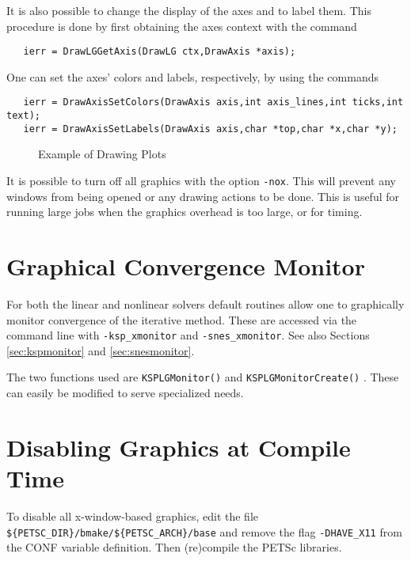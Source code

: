 {It is also possible to change the display of the axes and to label
them. This procedure is done by first obtaining the axes context with the 
command  
\begin{verbatim}
   ierr = DrawLGGetAxis(DrawLG ctx,DrawAxis *axis);
\end{verbatim}
One can set the axes' colors and labels, respectively, by using the
commands  
\begin{verbatim}
   ierr = DrawAxisSetColors(DrawAxis axis,int axis_lines,int ticks,int text);
   ierr = DrawAxisSetLabels(DrawAxis axis,char *top,char *x,char *y);
\end{verbatim}

\begin{figure}[H]
{\small
{}
}
\caption{Example of Drawing Plots}
\label{fig:plot}
\end{figure}

It is possible to turn off all graphics with the option 
{\tt -nox}. This
will prevent any windows from being opened or any drawing actions to be done.
This is useful for running large jobs when the graphics overhead is too
large, or for timing.

\section{Graphical Convergence Monitor}
For both the linear and nonlinear solvers default routines
allow one to graphically monitor convergence of the iterative method.
These are accessed via the command line with 
{\tt -ksp\_xmonitor} and {\tt -snes\_xmonitor}. 
 See also Sections \ref{sec:kspmonitor} and
\ref{sec:snesmonitor}. 

The two functions used are {\tt KSPLGMonitor()} 
and {\tt KSPLGMonitorCreate()}  . These 
can easily be modified to serve specialized needs.


\section{Disabling Graphics at Compile Time}

To disable all x-window-based graphics, edit the file
{\tt \$\{PETSC\_DIR\}/bmake/\$\{PETSC\_ARCH\}/base} and remove the flag
{\tt -DHAVE\_X11} from the CONF variable definition.  Then (re)compile
the PETSc libraries.

}
